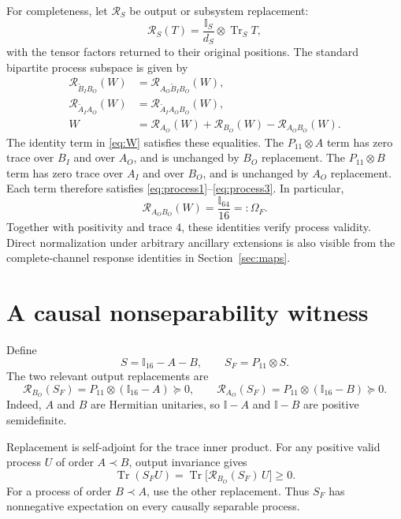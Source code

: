 \documentclass[11pt,letterpaper]{article}
\theoremstyle{remark}\newtheorem{remark}[theorem]{Remark}
\newcommand{\Tr}{\operatorname{Tr}}
\newcommand{\I}{\mathbb I}
\newcommand{\rep}[2]{\mathcal R_{#1}(#2)}
\newcommand{\Ain}{\widetilde A_I}
\newcommand{\Bin}{\widetilde B_I}
\begin{document}
For completeness, let $\mathcal R_S$ be output or subsystem replacement:
\[
 \rep{S}{T}=\frac{\I_S}{d_S}\otimes\Tr_S T,
\]
with the tensor factors returned to their original positions. The standard bipartite process subspace is given by
\begin{align}
 \rep{\Bin B_O}{W}&=\rep{A_O\Bin B_O}{W},\label{eq:process1}\\
 \rep{\Ain A_O}{W}&=\rep{\Ain A_OB_O}{W},\label{eq:process2}\\
 W&=\rep{A_O}{W}+\rep{B_O}{W}-\rep{A_OB_O}{W}.
 \label{eq:process3}
\end{align}
The identity term in \eqref{eq:W} satisfies these equalities. The $P_{11}\otimes A$ term has zero trace over $B_I$ and over $A_O$, and is unchanged by $B_O$ replacement. The $P_{11}\otimes B$ term has zero trace over $A_I$ and over $B_O$, and is unchanged by $A_O$ replacement. Each term therefore satisfies \eqref{eq:process1}--\eqref{eq:process3}. In particular,
\begin{equation}\label{eq:white}
 \rep{A_OB_O}{W}=\frac{\I_{64}}{16}=:\Omega_F.
\end{equation}
Together with positivity and trace $4$, these identities verify process validity. Direct normalization under arbitrary ancillary extensions is also visible from the complete-channel response identities in Section~\ref{sec:maps}.

\section{A causal nonseparability witness}\label{sec:witness}

Define
\begin{equation}\label{eq:witness}
 S=\I_{16}-A-B,\qquad S_F=P_{11}\otimes S.
\end{equation}
The two relevant output replacements are
\begin{equation}\label{eq:witness-replacements}
 \rep{B_O}{S_F}=P_{11}\otimes(\I_{16}-A)\succeq0,
 \qquad
 \rep{A_O}{S_F}=P_{11}\otimes(\I_{16}-B)\succeq0.
\end{equation}
Indeed, $A$ and $B$ are Hermitian unitaries, so $\I-A$ and $\I-B$ are positive semidefinite.

Replacement is self-adjoint for the trace inner product. For any positive valid process $U$ of order $A\prec B$, output invariance gives
\[
 \Tr(S_FU)=\Tr\bigl[\rep{B_O}{S_F}\,U\bigr]\ge0.
\]
For a process of order $B\prec A$, use the other replacement. Thus $S_F$ has nonnegative expectation on every causally separable process.
\end{document}

